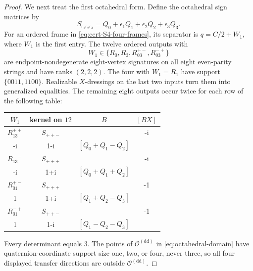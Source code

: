 \documentclass[11pt,letterpaper,onecolumn]{article}
\theoremstyle{plain}
\theoremstyle{definition}
\theoremstyle{remark}
\newcommand{\OctDD}{{\mathcal O^{(\mathrm{dd})}}}
\begin{document}
\begin{proof}
We next treat the first octahedral form.  Define the octahedral sign matrices by
\[
 S_{\epsilon_1\epsilon_2\epsilon_3}
 =Q_0+\epsilon_1Q_1+\epsilon_2Q_2+\epsilon_3Q_3.
\]
For an ordered frame in \cref{eq:cert-S4-four-frames}, its separator is
\(q=C/2+W_1\), where \(W_1\) is the first entry.  The twelve ordered
outputs with
\[
 W_1\in\{R_0,R_3,R_{03}^{+-},R_{03}^{-+}\}
\]
are endpoint-nondegenerate eight-vertex signatures on all eight even-parity strings and have ranks
\((2,2,2)\).  The four with \(W_1=R_1\) have support
\(\{0011,1100\}\). Realizable \(X\)-dressings on the last two inputs turn them
into generalized equalities.  The remaining eight outputs occur twice
for each row of the following table:
\begin{center}
\normalsize
\setlength{\tabcolsep}{5pt}
\begin{tabular}{cccc}
\toprule
\(W_1\)&kernel on \(12\)&\(B\)&\([BX]\)\\
\midrule
\(R_{13}^{++}\)&\(S_{++-}\)&
 \(\begin{psmallmatrix}1+i&-i\\-i&1-i\end{psmallmatrix}\)&
 \([Q_0+Q_1-Q_2]\)\\
\(R_{13}^{--}\)&\(S_{+++}\)&
 \(\begin{psmallmatrix}1-i&-i\\-i&1+i\end{psmallmatrix}\)&
 \([Q_0+Q_1+Q_2]\)\\
\(R_{01}^{+-}\)&\(S_{+++}\)&
 \(\begin{psmallmatrix}1-i&-1\\1&1+i\end{psmallmatrix}\)&
 \([Q_1+Q_2-Q_3]\)\\
\(R_{01}^{-+}\)&\(S_{++-}\)&
 \(\begin{psmallmatrix}1+i&-1\\1&1-i\end{psmallmatrix}\)&
 \([Q_1-Q_2-Q_3]\)\\
\bottomrule
\end{tabular}
\end{center}
Every determinant equals \(3\).  The points of \(\OctDD\) in
\cref{eq:octahedral-domain} have quaternion-coordinate support size one,
two, or four, never three, so all four displayed transfer directions are
outside \(\OctDD\).


\end{proof}
\end{document}
